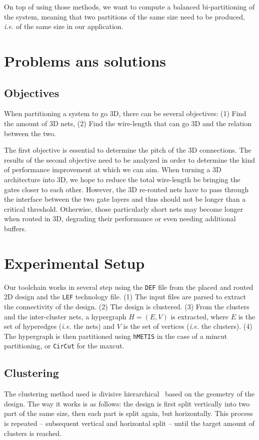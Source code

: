 \documentclass[conference]{IEEEtran}
\begin{document}
On top of using those methods, we want to compute a balanced bi-partitioning of the system, meaning that two partitions of the same size need to be produced, \textit{i.e.} of the same size in our application.

\newpage

\section{Problems ans solutions}



\subsection{Objectives}
When partitioning a system to go 3D, there can be several objectives: (1) Find the amount of 3D nets, (2) Find the wire-length that can go 3D and the relation between the two.

The first objective is essential to determine the pitch of the 3D connections.
The results of the second objective need to be analyzed in order to determine the kind of performance improvement at which we can aim.
When turning a 3D architecture into 3D, we hope to reduce the total wire-length be bringing the gates closer to each other.
However, the 3D re-routed nets have to pass through the interface between the two gate layers and thus should not be longer than a critical threshold.
Otherwise, those particularly short nets may become longer when routed in 3D, degrading their performance or even needing additional buffers.

\newpage

\section{Experimental Setup}

Our toolchain works in several step using the \texttt{DEF} file from the placed and routed 2D design and the \texttt{LEF} technology file.
(1) The input files are parsed to extract the connectivity of the design.
(2) The design is clustered.
(3) From the clusters and the inter-cluster nets, a hypergraph $H = (E, V)$ is extracted, where $E$ is the set of hyperedges (\textit{i.e.} the nets) and $V$ is the set of vertices (\textit{i.e.} the clusters).
(4) The hypergraph is then partitioned using \texttt{hMETIS} in the case of a mincut partitioning, or \texttt{CirCut} for the maxcut.

\subsection{Clustering}
The clustering method used is divisive hierarchical~\cite{Rokach2005} based on the geometry of the design.
The way it works is as follows: the design is first split vertically into two part of the same size, then each part is split again, but horizontally.
This process is repeated -- subsequent vertical and horizontal split -- until the target amount of clusters is reached.
\end{document}
